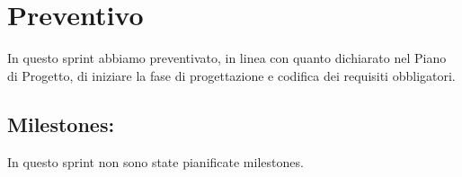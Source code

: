 \section{Preventivo}

In questo sprint abbiamo preventivato, in linea con quanto dichiarato nel Piano di Progetto, di iniziare la fase di progettazione e codifica dei requisiti obbligatori.

\subsection{Milestones:}  

In questo sprint non sono state pianificate milestones.